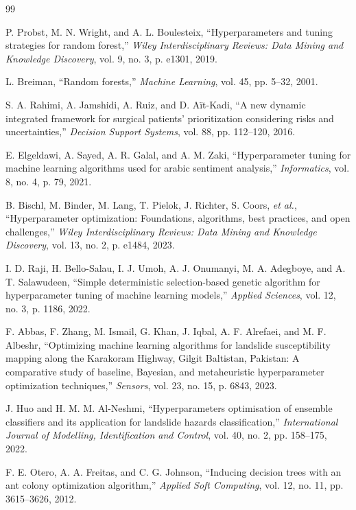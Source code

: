 \documentclass[letterpaper, 10 pt, conference]{ieeeconf}
\begin{document}
\begin{thebibliography}{99}

	 P. Probst, M. N. Wright, and A. L. Boulesteix, ``Hyperparameters and tuning strategies for random forest,'' \emph{Wiley Interdisciplinary Reviews: Data Mining and Knowledge Discovery}, vol. 9, no. 3, p. e1301, 2019.

	 L. Breiman, ``Random forests,'' \emph{Machine Learning}, vol. 45, pp. 5--32, 2001.

	 S. A. Rahimi, A. Jamshidi, A. Ruiz, and D. A\"it-Kadi, ``A new dynamic integrated framework for surgical patients' prioritization considering risks and uncertainties,'' \emph{Decision Support Systems}, vol. 88, pp. 112--120, 2016.

	 E. Elgeldawi, A. Sayed, A. R. Galal, and A. M. Zaki, ``Hyperparameter tuning for machine learning algorithms used for arabic sentiment analysis,'' \emph{Informatics}, vol. 8, no. 4, p. 79, 2021.

	 B. Bischl, M. Binder, M. Lang, T. Pielok, J. Richter, S. Coors, \emph{et al.}, ``Hyperparameter optimization: Foundations, algorithms, best practices, and open challenges,'' \emph{Wiley Interdisciplinary Reviews: Data Mining and Knowledge Discovery}, vol. 13, no. 2, p. e1484, 2023.

	 I. D. Raji, H. Bello-Salau, I. J. Umoh, A. J. Onumanyi, M. A. Adegboye, and A. T. Salawudeen, ``Simple deterministic selection-based genetic algorithm for hyperparameter tuning of machine learning models,'' \emph{Applied Sciences}, vol. 12, no. 3, p. 1186, 2022.

	 F. Abbas, F. Zhang, M. Ismail, G. Khan, J. Iqbal, A. F. Alrefaei, and M. F. Albeshr, ``Optimizing machine learning algorithms for landslide susceptibility mapping along the Karakoram Highway, Gilgit Baltistan, Pakistan: A comparative study of baseline, Bayesian, and metaheuristic hyperparameter optimization techniques,'' \emph{Sensors}, vol. 23, no. 15, p. 6843, 2023.

	 J. Huo and H. M. M. Al-Neshmi, ``Hyperparameters optimisation of ensemble classifiers and its application for landslide hazards classification,'' \emph{International Journal of Modelling, Identification and Control}, vol. 40, no. 2, pp. 158--175, 2022.

	 F. E. Otero, A. A. Freitas, and C. G. Johnson, ``Inducing decision trees with an ant colony optimization algorithm,'' \emph{Applied Soft Computing}, vol. 12, no. 11, pp. 3615--3626, 2012.


\end{thebibliography}
\end{document}
